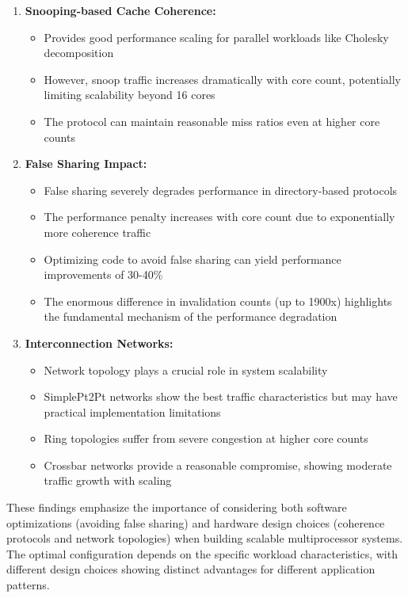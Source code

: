 \documentclass[9pt]{IEEEtran}
\begin{document}
\begin{enumerate}
  \item \textbf{Snooping-based Cache Coherence:}
  \begin{itemize}
    \item Provides good performance scaling for parallel workloads like Cholesky decomposition
    \item However, snoop traffic increases dramatically with core count, potentially limiting scalability beyond 16 cores
    \item The protocol can maintain reasonable miss ratios even at higher core counts
  \end{itemize}

  \item \textbf{False Sharing Impact:}
  \begin{itemize}
    \item False sharing severely degrades performance in directory-based protocols
    \item The performance penalty increases with core count due to exponentially more coherence traffic
    \item Optimizing code to avoid false sharing can yield performance improvements of 30-40\%
    \item The enormous difference in invalidation counts (up to 1900x) highlights the fundamental mechanism of the performance degradation
  \end{itemize}

  \item \textbf{Interconnection Networks:}
  \begin{itemize}
    \item Network topology plays a crucial role in system scalability
    \item SimplePt2Pt networks show the best traffic characteristics but may have practical implementation limitations
    \item Ring topologies suffer from severe congestion at higher core counts
    \item Crossbar networks provide a reasonable compromise, showing moderate traffic growth with scaling
  \end{itemize}
\end{enumerate}

These findings emphasize the importance of considering both software optimizations (avoiding false sharing) and hardware design choices (coherence protocols and network topologies) when building scalable multiprocessor systems. The optimal configuration depends on the specific workload characteristics, with different design choices showing distinct advantages for different application patterns.
\end{document}
